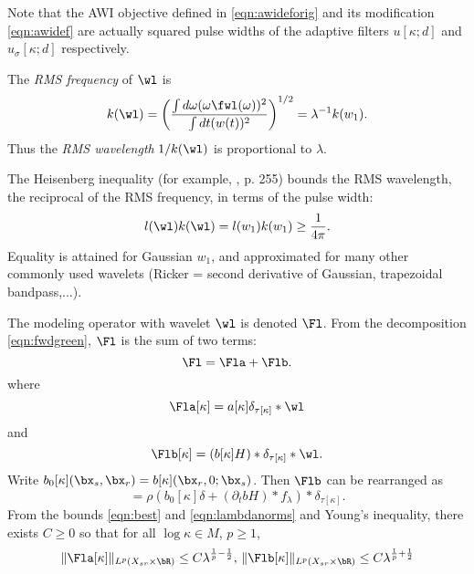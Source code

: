 Note that the AWI objective defined in \ref{eqn:awideforig} and its
modification \ref{eqn:awidef} are actually
squared pulse widths of the adaptive filters $u[\kappa;d]$ and
$u_{\sigma}[\kappa;d]$ respectively.

The {\em RMS frequency} of $\wl$ is
\begin{equation}
  \label{eqn:freq}
  k(\wl) = \left(\frac{\int d\omega (\omega \fwl(\omega))^2}{\int dt (w(t))^2} \right)^{1/2} = \lambda^{-1}k(w_1).
\end{equation}
Thus the {\em RMS wavelength} $1/k(\wl)$ is proportional to $\lambda$.

The Heisenberg inequality (for example, \cite{Folland:07}, p. 255) bounds the RMS
wavelength, the reciprocal of the RMS frequency, in terms of the pulse
width:
\begin{equation}
  \label{eqn:heis}
  l(\wl) k(\wl) = l(w_1)k(w_1) \ge \frac{1}{4\pi}.
\end{equation}
Equality is attained for Gaussian $w_1$, and approximated for many other
commonly used wavelets (Ricker = second derivative of Gaussian,
trapezoidal bandpass,...).

The modeling operator with wavelet $\wl$ is denoted $\Fl$. From the
decomposition \ref{eqn:fwdgreen}, $\Fl$ is the sum of two terms:
\begin{equation}
  \label{eqn:Flamdecomp}
  \Fl = \Fla + \Flb.
\end{equation}
where
\begin{equation}
  \label{eqn:Fl0}
  \Fla[\kappa]= a[\kappa]\delta_{\tau[\kappa]}*\wl
\end{equation}
and
\[
\Flb[\kappa] = (b[\kappa]H) *\delta_{\tau[\kappa]}*\wl.
\]
Write $b_0[\kappa](\bx_s,\bx_r) = b[\kappa](\bx_r,0;\bx_s)$. Then
$\Flb$ can be rearranged as
\begin{equation}
  \label{eqn:Fl1}
  =\rho (b_0[\kappa]\delta + (\partial_t b H) * f_{\lambda} )*\delta_{\tau[\kappa]}.
\end{equation}
From the bounds \ref{eqn:best} and \ref{eqn:lambdanorms} and Young's
inequality, there exists $C \ge 0$ so that for all $\log \kappa \in M$, $p
\ge 1$,
\begin{equation}
  \label{eqn:Frembd}
 \|\Fla[\kappa]\|_{ L^p(X_{sr} \times \bR)} \le C\lambda^{\frac{1}{p}-\frac{1}{2}},\,\|\Flb[\kappa]\|_{ L^p(X_{sr} \times \bR)} \le C\lambda^{\frac{1}{p}+\frac{1}{2}}
\end{equation}

